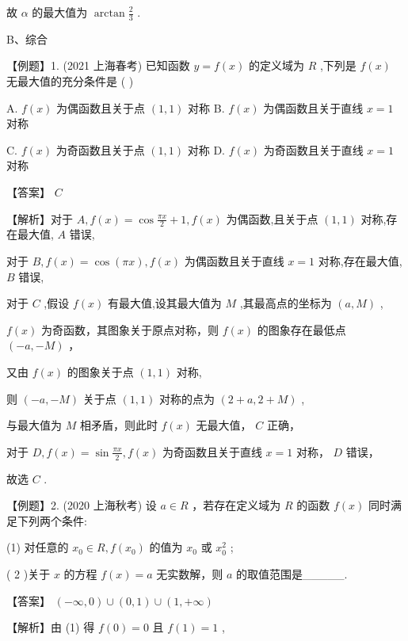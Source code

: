 \documentclass[10pt]{article}
\begin{document}
故 \(\alpha\) 的最大值为 \(\arctan \frac{2}{3}\) .

B、综合

【例题】1. (2021 上海春考) 已知函数 \(y = f\left( x\right)\) 的定义域为 \(R\) ,下列是 \(f\left( x\right)\) 无最大值的充分条件是 ( )

A. \(f\left( x\right)\) 为偶函数且关于点 \(\left( {1,1}\right)\) 对称 B. \(f\left( x\right)\) 为偶函数且关于直线 \(x = 1\) 对称

C. \(f\left( x\right)\) 为奇函数且关于点 \(\left( {1,1}\right)\) 对称 D. \(f\left( x\right)\) 为奇函数且关于直线 \(x = 1\) 对称

【答案】 \(C\)

【解析】对于 \(A,f\left( x\right)  = \cos \frac{\pi x}{2} + 1,f\left( x\right)\) 为偶函数,且关于点 \(\left( {1,1}\right)\) 对称,存在最大值, \(A\) 错误,

对于 \(B,f\left( x\right)  = \cos \left( {\pi x}\right) ,f\left( x\right)\) 为偶函数且关于直线 \(x = 1\) 对称,存在最大值, \(B\) 错误,

对于 \(C\) ,假设 \(f\left( x\right)\) 有最大值,设其最大值为 \(M\) ,其最高点的坐标为 \(\left( {a,M}\right)\) ,

\(f\left( x\right)\) 为奇函数，其图象关于原点对称，则 \(f\left( x\right)\) 的图象存在最低点 \(\left( {-a, - M}\right)\) ，

又由 \(f\left( x\right)\) 的图象关于点 \(\left( {1,1}\right)\) 对称,

则 \(\left( {-a, - M}\right)\) 关于点 \(\left( {1,1}\right)\) 对称的点为 \(\left( {2 + a,2 + M}\right)\) ,

与最大值为 \(M\) 相矛盾，则此时 \(f\left( x\right)\) 无最大值， \(C\) 正确，

对于 \(D,f\left( x\right)  = \sin \frac{\pi x}{2},f\left( x\right)\) 为奇函数且关于直线 \(x = 1\) 对称， \(D\) 错误，

故选 \(C\) .

【例题】2. (2020 上海秋考) 设 \(a \in  R\) ，若存在定义域为 \(R\) 的函数 \(f\left( x\right)\) 同时满足下列两个条件:

(1) 对任意的 \({x}_{0} \in  R,f\left( {x}_{0}\right)\) 的值为 \({x}_{0}\) 或 \({x}_{0}^{2}\) ;

( 2 )关于 \(x\) 的方程 \(f\left( x\right)  = a\) 无实数解，则 \(a\) 的取值范围是\_\_\_\_\_.

【答案】 \(\left( {-\infty ,0}\right)  \cup  \left( {0,1}\right)  \cup  \left( {1, + \infty }\right)\)

【解析】由 (1) 得 \(f\left( 0\right)  = 0\) 且 \(f\left( 1\right)  = 1\) ,
\end{document}
